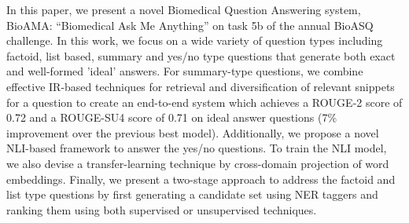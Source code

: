 In this paper, we present a novel Biomedical Question Answering system, BioAMA: ``Biomedical Ask Me Anything'' on task 5b of the annual BioASQ challenge. In this work, we focus on a wide variety of question types including factoid, list based, summary and yes/no type questions that generate both exact and well-formed 'ideal' answers. For summary-type questions, we combine effective IR-based techniques for retrieval and diversification of relevant snippets for a question to create an end-to-end system which achieves a ROUGE-2 score of 0.72 and a ROUGE-SU4 score of 0.71 on ideal answer questions (7\%  improvement over the previous best model). Additionally, we propose a novel NLI-based framework to answer the yes/no questions. To train the NLI model, we also devise a transfer-learning technique by cross-domain projection of word embeddings. Finally, we present a two-stage approach to address the factoid and list type questions by first generating a candidate set using NER taggers and ranking them using both supervised or unsupervised techniques.
